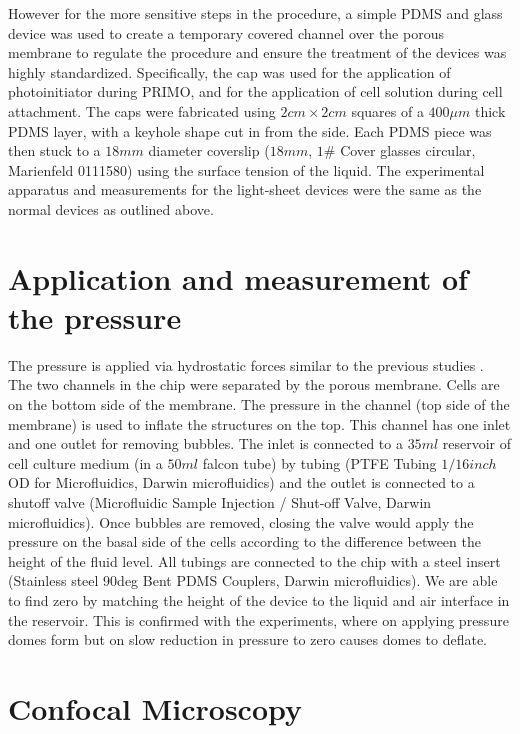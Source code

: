 However for the more sensitive steps in the procedure, a simple PDMS and glass device was used to create a temporary covered channel over the porous membrane to regulate the procedure and ensure the treatment of the devices was highly standardized. Specifically, the cap was used for the application of photoinitiator during PRIMO, and for the application of cell solution during cell attachment. The caps were fabricated using $2cm\times2cm$ squares of a $400\mu m$ thick PDMS layer, with a keyhole shape cut in from the side. Each PDMS piece was then stuck to a $18mm$ diameter coverslip ($18mm$, $1\#$ Cover glasses circular, Marienfeld 0111580) using the surface tension of the liquid. The experimental apparatus and measurements for the light-sheet devices were the same as the normal devices as outlined above.

\section{Application and measurement of the pressure}

The pressure is applied via hydrostatic forces similar to the previous studies \cite{choudhury2022, palmer2021}. The two channels in the chip were separated by the porous membrane. Cells are on the bottom side of the membrane. The pressure in the channel (top side of the membrane) is used to inflate the structures on the top. This channel has one inlet and one outlet for removing bubbles. The inlet is connected to a $35 ml$ reservoir of cell culture medium (in a $50 ml$ falcon tube) by tubing (PTFE Tubing $1/16  inch$ OD for Microfluidics, Darwin microfluidics) and the outlet is connected to a shutoff valve (Microfluidic Sample Injection / Shut-off Valve, Darwin microfluidics). Once bubbles are removed, closing the valve would apply the pressure on the basal side of the cells according to the difference between the height of the fluid level. All tubings are connected to the chip with a steel insert (Stainless steel 90deg Bent PDMS Couplers, Darwin microfluidics). We are able to find zero by matching the height of the device to the liquid and air interface in the reservoir. This is confirmed with the experiments, where on applying pressure domes form but on slow reduction in pressure to zero causes domes to deflate.

\section{Confocal Microscopy}

